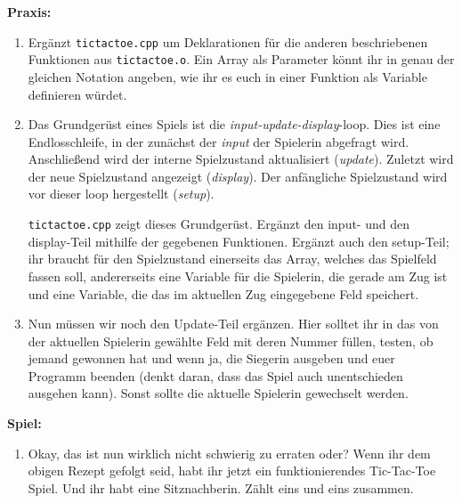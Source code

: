 \textbf{Praxis:}
\begin{enumerate}
    \item Ergänzt \texttt{tictactoe.cpp} um Deklarationen für die anderen
        beschriebenen Funktionen aus \texttt{tictactoe.o}. Ein Array als
        Parameter könnt ihr in genau der gleichen Notation angeben, wie ihr es
        euch in einer Funktion als Variable definieren würdet.
    \item Das Grundgerüst eines Spiels ist die \emph{input-update-display}-loop.
        Dies ist eine Endlosschleife, in der zunächst der \emph{input} der
        Spielerin abgefragt wird. Anschließend wird der interne Spielzustand
        aktualisiert (\emph{update}). Zuletzt wird der neue Spielzustand
        angezeigt (\emph{display}). Der anfängliche Spielzustand wird vor
        dieser loop hergestellt (\emph{setup}).

        \texttt{tictactoe.cpp} zeigt dieses Grundgerüst. Ergänzt den input- und
        den display-Teil mithilfe der gegebenen Funktionen. Ergänzt auch den
        setup-Teil; ihr braucht für den Spielzustand einerseits das Array,
        welches das Spielfeld fassen soll, andererseits eine Variable für die
        Spielerin, die gerade am Zug ist und eine Variable, die das im
        aktuellen Zug eingegebene Feld speichert.
    \item Nun müssen wir noch den Update-Teil ergänzen. Hier solltet ihr in das
        von der aktuellen Spielerin gewählte Feld mit deren Nummer füllen,
        testen, ob jemand gewonnen hat und wenn ja, die Siegerin ausgeben und
        euer Programm beenden (denkt daran, dass das Spiel auch unentschieden
        ausgehen kann). Sonst sollte die aktuelle Spielerin gewechselt werden.
\end{enumerate}

\textbf{Spiel:}
\begin{enumerate}
    \item Okay, das ist nun wirklich nicht schwierig zu erraten oder? Wenn ihr
        dem obigen Rezept gefolgt seid, habt ihr jetzt ein funktionierendes
        Tic-Tac-Toe Spiel. Und ihr habt eine Sitznachberin. Zählt eins und eins
        zusammen.
\end{enumerate}
